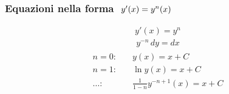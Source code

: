 \documentclass[letterpaper,10pt,italian]{jupyterBook}
\begin{document}
\subsubsection*{Equazioni nella forma \protect\(\ y'(x) = y^n(x)\protect\)}
\begin{equation*}
\begin{split}y'(x) = y^n\end{split}
\end{equation*}\begin{equation*}
\begin{split}y^{-n} \, dy = dx\end{split}
\end{equation*}\begin{equation*}
\begin{split}\begin{aligned}
 n = 0: & \quad  y(x) = x + C \\
 n = 1: & \quad  \ln y(x) = x + C \\
 \dots: & \quad  \frac{1}{1-n} y^{-n+1}(x) = x + C  \\
\end{aligned}\end{split}
\end{equation*}
\sphinxstepscope
\end{document}
